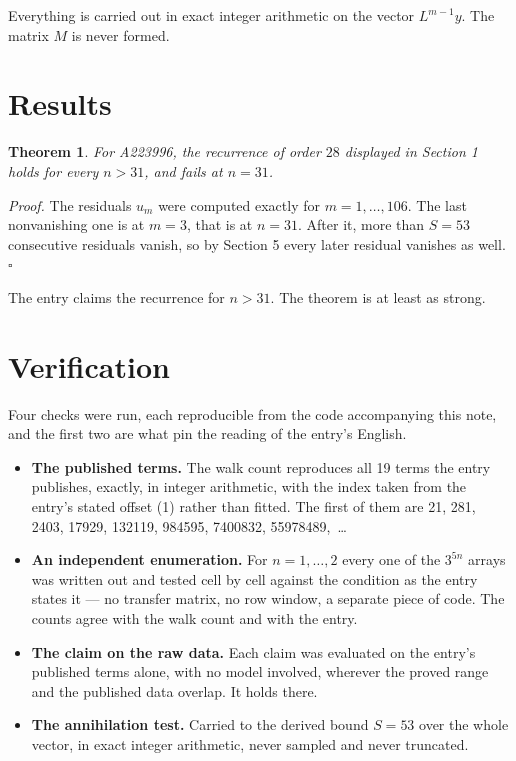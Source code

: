 \documentclass[11pt]{article}
\newtheorem{theorem}{Theorem}
\theoremstyle{definition}
\begin{document}
Everything is carried out in exact integer arithmetic on the vector $L^{m-1}y$. The matrix $M$ is never formed.

\section{Results}

\begin{theorem} For A223996, the recurrence of order $28$ displayed in Section 1 holds for every $n > 31$, and fails at $n = 31$.\end{theorem}

{\itshape Proof.} The residuals $u_m$ were computed exactly for $m = 1,\dots,106$. The last nonvanishing one is at $m = 3$, that is at $n = 31$. After it, more than $S = 53$ consecutive residuals vanish, so by Section 5 every later residual vanishes as well. $\square$

The entry claims the recurrence for $n > 31$. The theorem is at least as strong.

\section{Verification}

Four checks were run, each reproducible from the code accompanying this note, and the first two are what pin the reading of the entry's English.

\begin{itemize}

\item {\bfseries The published terms.} The walk count reproduces all 19 terms the entry publishes, exactly, in integer arithmetic, with the index taken from the entry's stated offset (1) rather than fitted. The first of them are 21, 281, 2403, 17929, 132119, 984595, 7400832, 55978489,~\dots

\item {\bfseries An independent enumeration.} For $n = 1,\dots,2$ every one of the $3^{5n}$ arrays was written out and tested cell by cell against the condition as the entry states it --- no transfer matrix, no row window, a separate piece of code. The counts agree with the walk count and with the entry.

\item {\bfseries The claim on the raw data.} Each claim was evaluated on the entry's published terms alone, with no model involved, wherever the proved range and the published data overlap. It holds there.

\item {\bfseries The annihilation test.} Carried to the derived bound $S = 53$ over the whole vector, in exact integer arithmetic, never sampled and never truncated.

\end{itemize}
\end{document}
